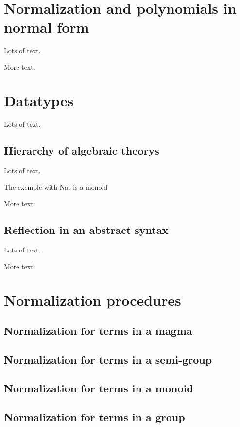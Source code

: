 \documentclass{sigplanconf}
\begin{document}
\section{Normalization and polynomials in normal form}
Lots of text.

More text.

\section{Datatypes}

Lots of text.

\subsection{Hierarchy of algebraic theorys}

Lots of text.

The exemple with Nat is a monoid

More text.

\subsection{Reflection in an abstract syntax}

Lots of text.

More text. 

\section{Normalization procedures}

\subsection{Normalization for terms in a magma}

\subsection{Normalization for terms in a semi-group}

\subsection{Normalization for terms in a monoid}

\subsection{Normalization for terms in a group}
\end{document}
